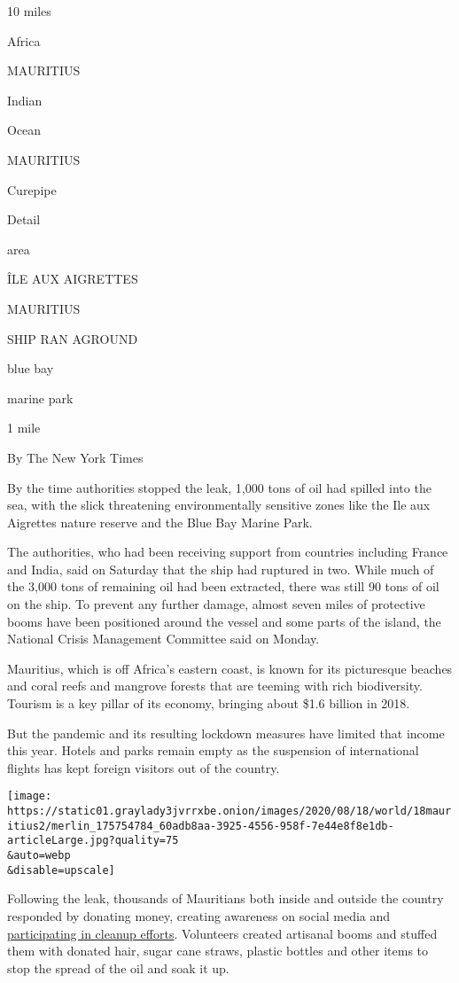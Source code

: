 10 miles

Africa

MAURITIUS

Indian

Ocean

MAURITIUS

Curepipe

Detail

area

ÎLE AUX AIGRETTES

MAURITIUS

SHIP RAN AGROUND

blue bay

marine park

1 mile

By The New York Times

By the time authorities stopped the leak, 1,000 tons of oil had spilled
into the sea, with the slick threatening environmentally sensitive zones
like the Ile aux Aigrettes nature reserve and the Blue Bay Marine Park.

The authorities, who had been receiving support from countries including
France and India, said on Saturday that the ship had ruptured in two.
While much of the 3,000 tons of remaining oil had been extracted, there
was still 90 tons of oil on the ship. To prevent any further damage,
almost seven miles of protective booms have been positioned around the
vessel and some parts of the island, the National Crisis Management
Committee said on Monday.

Mauritius, which is off Africa's eastern coast, is known for its
picturesque beaches and coral reefs and mangrove forests that are
teeming with rich biodiversity. Tourism is a key pillar of its economy,
bringing about \$1.6 billion in 2018.

But the pandemic and its resulting lockdown measures have limited that
income this year. Hotels and parks remain empty as the suspension of
international flights has kept foreign visitors out of the country.

\texttt{[image: https://static01.graylady3jvrrxbe.onion/images/2020/08/18/world/18mauritius2/merlin\_175754784\_60adb8aa-3925-4556-958f-7e44e8f8e1db-articleLarge.jpg?quality=75\\\&auto=webp\\\&disable=upscale]}

Following the leak, thousands of Mauritians both inside and outside the
country responded by donating money, creating awareness on social media
and
\href{https://www.nytimes3xbfgragh.onion/2020/08/14/world/africa/mauritius-oil-spill.html}{participating
in cleanup efforts}. Volunteers created artisanal booms and stuffed them
with donated hair, sugar cane straws, plastic bottles and other items to
stop the spread of the oil and soak it up.

